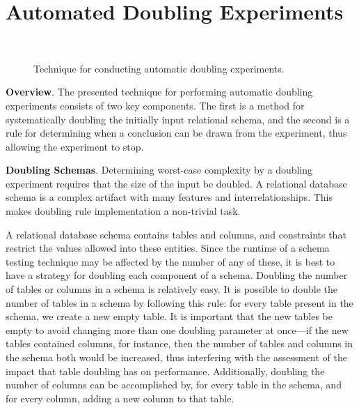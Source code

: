 
\vspace*{-.035in}
\section{Automated Doubling Experiments}\label{sec:technique}
\vspace*{-.035in}

  \begin{figure*}
    
    \vspace*{-.1in}
    \caption{Technique for conducting automatic doubling experiments.}~\label{fig:doublingexp}
    \vspace*{-.1in}
  \end{figure*}


  {\bf Overview}. The presented technique for performing automatic doubling experiments consists of two key components.
  The first is a method for systematically doubling the initially input relational schema, and the second is a rule for
  determining when a conclusion can be drawn from the experiment, thus allowing the experiment to stop.

  \textbf{Doubling Schemas}. Determining worst-case complexity by a doubling experiment requires that the size of the
  input be doubled. A relational database schema is a complex artifact with many features and interrelationships.  This
  makes doubling rule implementation a non-trivial task.


  A relational database schema contains tables and columns, and constraints that restrict the values allowed into these
  entities. Since the runtime of a schema testing technique may be affected by the number of any of these, it is best to
  have a strategy for doubling each component of a schema. Doubling the number of tables or columns in a schema is
  relatively easy.  It is possible to double the number of tables in a schema by following this rule: for every table
  present in the schema, we create a new empty table. It is important that the new tables be empty to avoid changing
  more than one doubling parameter at once---if the new tables contained columns, for instance, then the number of
  tables and columns in the schema both would be increased, thus interfering with the assessment of the impact that
  table doubling has on performance.  Additionally, doubling the number of columns can be accomplished by, for every
  table in the schema, and for every column, adding a new column to that table.

